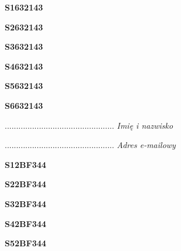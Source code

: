 \begin{turn}{90}\huge \textbf{S1632143}\end{turn}

\begin{turn}{90}\huge \textbf{S2632143}\end{turn}

\begin{turn}{90}\huge \textbf{S3632143}\end{turn}

\begin{turn}{90}\huge \textbf{S4632143}\end{turn}

\begin{turn}{90}\huge \textbf{S5632143}\end{turn}

\begin{turn}{90}\huge \textbf{S6632143}\end{turn}

\begin{turn}{90}\begin{minipage}{\linewidth} \vspace{20mm} ................................................  \textit{Imię i nazwisko}\end{minipage}\end{turn}

\begin{turn}{90}\begin{minipage}{\linewidth} \vspace{20mm} ................................................  \textit{Adres e-mailowy}\end{minipage}\end{turn}

\begin{turn}{90}\huge \textbf{S12BF344}\end{turn}

\begin{turn}{90}\huge \textbf{S22BF344}\end{turn}

\begin{turn}{90}\huge \textbf{S32BF344}\end{turn}

\begin{turn}{90}\huge \textbf{S42BF344}\end{turn}

\begin{turn}{90}\huge \textbf{S52BF344}\end{turn}

